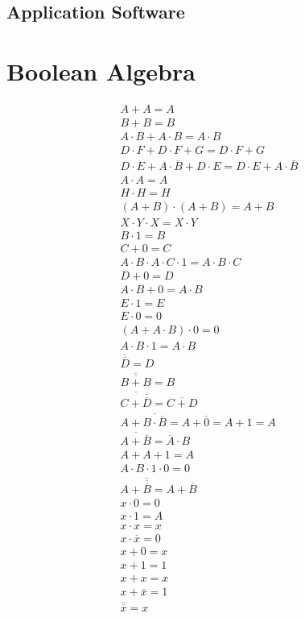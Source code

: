 \documentclass{article}
\begin{document}
\subsection{Application Software}

\break

\section{Boolean Algebra}

\begin{gather}
	A + A = A \\
	B + B = B \\
	A \cdot B + A \cdot B = A \cdot B \\
	D \cdot F + D \cdot F + G  = D \cdot F + G \\
	D \cdot E + A \cdot \overline{B} + D \cdot E = D \cdot E + A \cdot \bar{B} \\
	A \cdot A = A \\
	H \cdot H = H \\
	(A + B) \cdot (A + B) = A + B \\
	X \cdot Y \cdot X = X \cdot Y \\
	B \cdot 1 = B \\
	C + 0 = C \\
	A \cdot B \cdot A \cdot C \cdot 1 = A \cdot B \cdot C \\
	D + 0 = D \\
	A \cdot B + 0 = A \cdot B \\
	E \cdot 1 = E \\
	E \cdot 0 = 0 \\
	(A + A \cdot B) \cdot 0 = 0 \\
	A \cdot B \cdot 1 = A \cdot B \\
	\overline{\overline{D}} = D \\
	\overline{\overline{B + B}} = B \\
	\overline{C + \overline{\overline{D}}} = \overline{C + D} \\
	A + \overline{B \cdot \overline{B}} = A + \overline{0} = A + 1 = A \\
	\overline{A + \overline{B}}  = \overline{A} \cdot B \\ 
	A + A + 1 = A \\
	A \cdot B \cdot 1 \cdot 0 = 0 \\
	A + \overline{\overline{\overline{B}}} = A + \overline{B} \\
	x \cdot 0 = 0 \\
	x \cdot 1 = A \\
	x \cdot x = x \\
	x \cdot \overline{x} = 0 \\
	x + 0 = x \\
	x + 1 = 1 \\
	x + x = x \\
	x + \overline{x} = 1 \\
	\overline{\overline{x}} = x
\end{gather}
\end{document}
